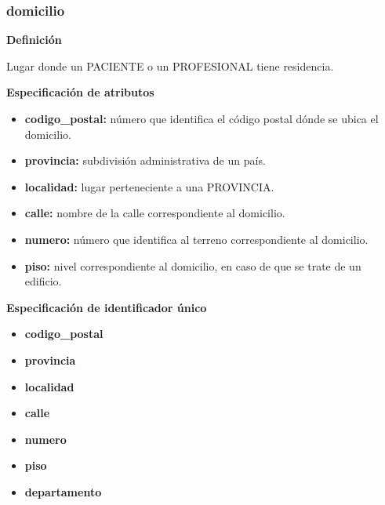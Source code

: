 \documentclass[a4paper,11pt]{article}
\begin{document}
\subsubsection{\textbf{domicilio}}

\textbf{Definición}

Lugar donde un PACIENTE o un PROFESIONAL tiene residencia.

\textbf{Especificación de atributos}

\begin{itemize}

     \item \textbf{codigo\_postal:} número que identifica el código postal dónde se ubica el domicilio.

     \item \textbf{provincia:} subdivisión administrativa de un país.

     \item \textbf{localidad:} lugar perteneciente a una PROVINCIA.

     \item \textbf{calle:} nombre de la calle correspondiente al domicilio.

     \item \textbf{numero:} número que identifica al terreno correspondiente al domicilio.

     \item \textbf{piso:} nivel correspondiente al domicilio, en caso de que se trate de un edificio.
\end{itemize}

\textbf{Especificación de identificador único}

\begin{itemize}

     \item \textbf{codigo\_postal}

     \item \textbf{provincia}

     \item \textbf{localidad}

     \item \textbf{calle}

     \item \textbf{numero}

     \item \textbf{piso}

     \item \textbf{departamento}

\end{itemize}
\end{document}
